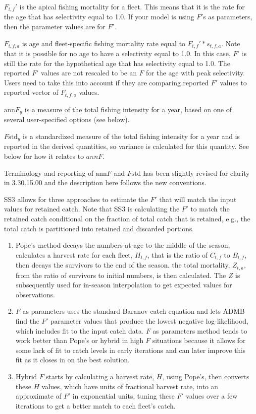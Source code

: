 $F_{t,f}'$ is the apical fishing mortality for a fleet. This means that it is the rate for the age that has selectivity equal to 1.0. If your model is using $F'$s as parameters, then the parameter values are for $F'$.

$F_{t,f,a}$ is age and fleet-specific fishing mortality rate equal to $F_{t,f}' * s_{t,f,a}$. Note that it is possible for no age to have a selectivity equal to 1.0. In this case, $F'$ is still the rate for the hypothetical age that has selectivity equal to 1.0. The reported $F'$ values are not rescaled to be an $F$ for the age with peak selectivity. Users need to take this into account if they are comparing reported $F'$ values to reported vector of $F_{t,f,a}$ values.

$\text{ann}F_y$ is a measure of the total fishing intensity for a year, based on one of several user-specified options (see below).

$F\text{std}_y$ is a standardized measure of the total fishing intensity for a year and is reported in the derived quantities, so variance is calculated for this quantity. See below for how it relates to $annF$.

Terminology and reporting of $\text{ann}F$ and $F\text{std}$ has been slightly revised for clarity in 3.30.15.00 and the description here follows the new conventions.

SS3 allows for three approaches to estimate the $F'$ that will match the input values for retained catch. Note that SS3 is calculating the $F'$ to match the retained catch conditional on the fraction of total catch that is retained, e.g., the total catch is partitioned into retained and discarded portions.

\begin{enumerate}
	\item Pope’s method decays the numbers-at-age to the middle of the season, calculates a harvest rate for each fleet, $H_{t,f}$, that is the ratio of $C_{t,f}$ to $B_{t,f}$, then decays the survivors to the end of the season. the total mortality, $Z_{t,a}$, from the ratio of survivors to initial numbers, is then calculated. The $Z$ is subsequently used for in-season interpolation to get expected values for observations.
	
	\item $F$ as parameters uses the standard Baranov catch equation and lets ADMB find the $F'$ parameter values that produce the lowest negative log-likelihood, which includes fit to the input catch data. $F$ as parameters method tends to work better than Pope’s or hybrid in high $F$ situations because it allows for some lack of fit to catch levels in early iterations and can later improve this fit as it closes in on the best solution.
	
	\item Hybrid $F$ starts by calculating a harvest rate, $H$, using Pope’s, then converts these $H$ values, which have units of fractional harvest rate, into an approximate of $F'$ in exponential units, tuning these $F'$ values over a few iterations to get a better match to each fleet’s catch.
\end{enumerate}

